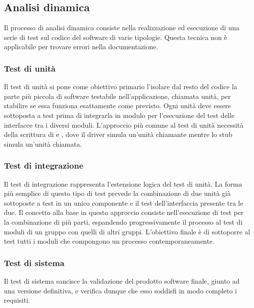 \documentclass[NormeDiProgetto.tex]{subfiles}
\begin{document}
	\subsection{Analisi dinamica}
	Il processo di analisi dinamica consiste nella realizzazione ed esecuzione di una serie di test sul codice del software di varie tipologie. Questa tecnica non è applicabile per trovare errori nella documentazione.

	\subsubsection{Test di unità}
	Il test di unità si pone come obiettivo primario l'isolare dal resto del codice la parte più piccola di software testabile nell'applicazione, chiamata unità, per stabilire se essa funziona esattamente come previsto. Ogni unità deve essere sottoposta a test prima di integrarla in modulo per l'esecuzione del test delle interfacce tra i diversi moduli.
	L'approccio più comune al test di unità necessità della scrittura di  e , dove il driver simula un'unità chiamante mentre lo stub simula un'unità chiamata.
	\subsubsection{Test di integrazione}
	Il test di integrazione rappresenta l'estensione logica del test di unità. La forma più semplice di questo tipo di test prevede la combinazione di due unità già sottoposte a test in un unico componente e il test dell'interfaccia presente tra le due. Il concetto alla base in questo approccio consiste nell'esecuzione di test per la combinazione di più parti, espandendo progressivamente il processo al test di moduli di un gruppo con quelli di altri gruppi. L'obiettivo finale è di sottoporre al test tutti i moduli che compongono un processo contemporaneamente.
	\subsubsection{Test di sistema}
	Il test di sistema sancisce la validazione del prodotto software finale, giunto ad una versione definitiva, e verifica dunque che esso soddisfi in modo completo i requisiti.
\end{document}

